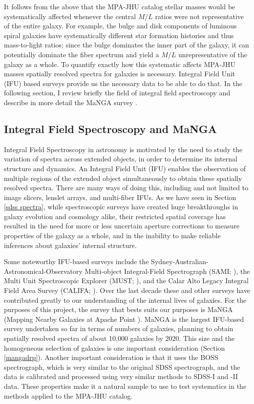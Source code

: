 It follows from the above that the MPA-JHU catalog stellar 
masses would be systematically affected whenever the 
central $M/L$ ratios were not representative of the 
entire galaxy. For example, the bulge and disk components
of luminous spiral galaxies have systematically different
star formation histories and thus mass-to-light ratios; 
since the bulge dominates the inner part of the galaxy,
it can potentially dominate the fiber spectrum and yield
a $M/L$ unrepresentative of the galaxy as a whole.
To quantify exactly how this systematic affects
MPA-JHU masses  spatially resolved spectra for galaxies
is necessary.
Integral Field Unit (IFU) based surveys provide us the 
necessary data to be able to do that. In the following
section, I review briefly  the field of integral field spectroscopy and describe in more detail the MaNGA survey
\citep{bundy_overview_2014}.

\subsection{Integral Field Spectroscopy and MaNGA}

Integral Field Spectroscopy in astronomy is motivated
by the need to study the variation of spectra across
extended objects, in order to determine its internal
structure and dynamics.
An Integral Field Unit (IFU) enables the observation 
of multiple regions of the extended object simultaneously 
to obtain these spatially resolved spectra. There are many 
ways of doing this, including and not limited to image 
slicers, lenslet arrays, and multi-fiber IFUs. As we 
have seen in Section \ref{sdss spectra}, while 
spectroscopic surveys have created huge breakthroughs 
in galaxy evolution and cosmology alike, their restricted 
spatial coverage has resulted in the need for more or 
less uncertain aperture corrections to measure properties
of the galaxy as a whole, and in the inability to 
make reliable inferences about galaxies' internal structure.

Some noteworthy IFU-based surveys include the 
Sydney-Australian-Astronomical-Observatory Multi-object Integral-Field Spectrograph (SAMI; \citealt{bryant_sami_2015}), the 
Multi Unit Spectroscopic Explorer (MUST; \citealt{bacon_muse_2015}), and the Calar Alto Legacy 
Integral Field Area Survey (CALIFA; \citealt{sanchez_califa_2012}). 
Over the last decade these and other surveys have
contributed greatly to our understanding of the internal 
lives of galaxies. 
For the purposes of this project, 
the survey that bests suits our purposes is 
MaNGA (Mapping Nearby Galaxies at Apache Point \citep{bundy_overview_2014}). MaNGA is the largest 
IFU-based survey undertaken so far in terms of 
numbers of galaxies, planning to obtain spatially 
resolved spectra of about 10,000 galaxies by 2020. 
This size and the homogeneous selection of 
galaxies is one important consideration 
(Section \ref{mangadrp}). Another important 
consideration is that it uses the BOSS spectrograph,
which is very similar to the original SDSS spectrograph,
and the data is calibrated and processed using very
similar methods to SDSS-I and -II data.
These properties make it a natural sample to use
to test systematics in the methods applied to 
the MPA-JHU catalog.

